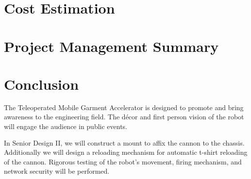 \documentclass[letterpaper,12pt]{article}
\begin{document}
\section{Cost Estimation}
\section{Project Management Summary}
\section{Conclusion}
\noindent The Teleoperated Mobile Garment Accelerator is designed to promote and bring awareness to the engineering field. The décor and first person vision of the robot will engage the audience in public events.\newline

\noindent In Senior Design II, we will construct a mount to affix the cannon to the chassis. Additionally we will design a reloading mechanism for automatic t-shirt reloading of the cannon. Rigorous testing of the robot’s movement, firing mechanism, and network security will be performed.
\end{document}
